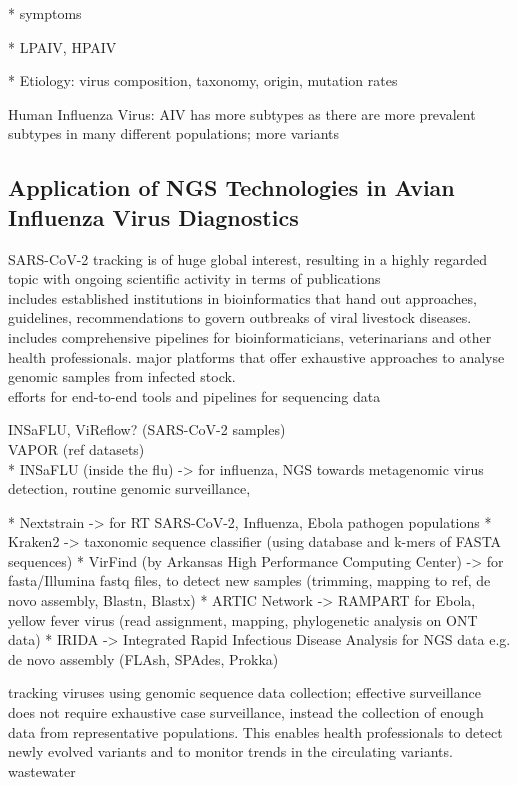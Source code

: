 * symptoms

* LPAIV, HPAIV

* Etiology: virus composition, taxonomy, origin, mutation rates

Human Influenza Virus:
AIV has more subtypes as there are more prevalent subtypes in many different populations; more variants

\subsection{Application of NGS Technologies in Avian Influenza Virus Diagnostics}

SARS-CoV-2 tracking is of huge global interest, resulting in a highly regarded topic with ongoing scientific activity in terms of publications \\
includes established institutions in bioinformatics that hand out approaches, guidelines, recommendations to govern outbreaks of viral livestock diseases. includes comprehensive pipelines for bioinformaticians, veterinarians and other health professionals.
major platforms that offer exhaustive approaches to analyse genomic samples from infected stock. \\

efforts for end-to-end tools and pipelines for sequencing data

INSaFLU, ViReflow? (SARS-CoV-2 samples) \\
 VAPOR (ref datasets) \\

* INSaFLU (inside the flu) -> for influenza, NGS towards metagenomic virus detection, routine genomic surveillance, 

* Nextstrain -> for RT SARS-CoV-2, Influenza, Ebola pathogen populations 
* Kraken2 -> taxonomic sequence classifier (using database and k-mers of FASTA sequences)
* VirFind (by Arkansas High Performance Computing Center) -> for fasta/Illumina fastq files, to detect new samples (trimming, mapping to ref, de novo assembly, Blastn, Blastx)
* ARTIC Network -> RAMPART for Ebola, yellow fever virus (read assignment, mapping, phylogenetic analysis on ONT data)
* IRIDA -> Integrated Rapid Infectious Disease Analysis for NGS data e.g. de novo assembly (FLAsh, SPAdes, Prokka)


tracking viruses using genomic sequence data collection; effective surveillance does not require exhaustive case surveillance, instead the collection of enough data from representative populations. This enables health professionals to detect newly evolved variants and to monitor trends in the circulating variants.\\
wastewater